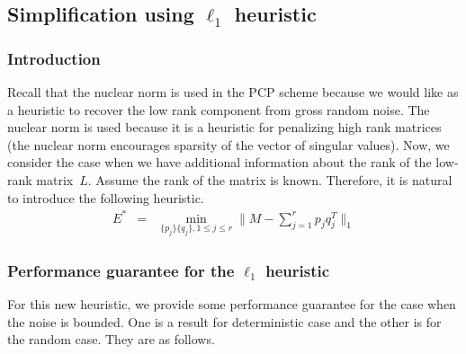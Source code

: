 \subsection{Simplification using $\ell_{1}$ heuristic}


\subsubsection{Introduction}

Recall that the nuclear norm is used in the PCP scheme because we would like as a heuristic to recover the low rank component from gross random noise. The nuclear norm is used because it is a heuristic for penalizing high rank matrices (the nuclear norm encourages sparsity of the vector of singular values). Now, we consider the case when we have additional information about the rank of the low-rank matrix~$L$. Assume the rank of the matrix is known. Therefore, it is natural to introduce the following heuristic.
%
\begin{eqnarray}
E^{*} & = & \min_{\{p_{j}\}\{q_{j}\},1\le j\le r}\|M-\sum_{j=1}^{r}p_{j}q_{j}^{T}\|_{1}\label{heu}
\end{eqnarray}



\subsubsection{Performance guarantee for the $\ell_1$ heuristic}

For this new heuristic, we provide some performance guarantee for the case when the noise is bounded. One is a result for deterministic case
and the other is for the random case. They are as follows.

